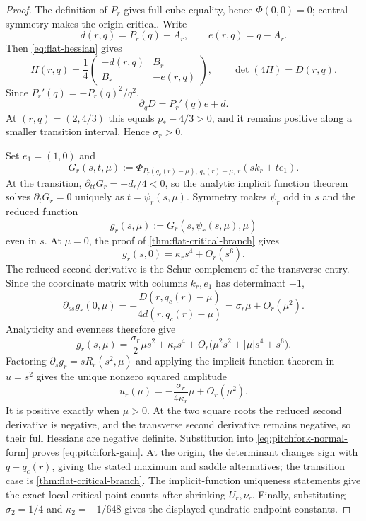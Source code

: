 \documentclass[11pt,reqno]{amsart}
\numberwithin{equation}{section}
\theoremstyle{definition}
\theoremstyle{remark}
\begin{document}
\begin{proof}
The definition of $P_r$ gives full-cube equality, hence $\Phi(0,0)=0$; central
symmetry makes the origin critical.  Write
\[
  d(r,q)=P_r(q)-A_r,\qquad e(r,q)=q-A_r.
\]
Then \eqref{eq:flat-hessian} gives
\[
  H(r,q)=\frac14
  \begin{pmatrix}
    -d(r,q)&B_r\\
    B_r&-e(r,q)
  \end{pmatrix},
  \qquad
  \det(4H)=D(r,q).
\]
Since $P_r'(q)=-P_r(q)^2/q^2$,
\[
  \partial_qD=P_r'(q)e+d.
\]
At $(r,q)=(2,4/3)$ this equals $p_*-4/3>0$, and it remains positive along a
smaller transition interval.  Hence $\sigma_r>0$.

Set $e_1=(1,0)$ and
\[
  G_r(s,t,\mu)
  :=\Phi_{P_r(q_c(r)-\mu),\,q_c(r)-\mu,\,r}(sk_r+te_1).
\]
At the transition, $\partial_{tt}G_r=-d_r/4<0$, so the analytic implicit
function theorem solves $\partial_tG_r=0$ uniquely as
$t=\psi_r(s,\mu)$.  Symmetry makes $\psi_r$ odd in $s$ and the reduced
function
\[
  g_r(s,\mu):=G_r(s,\psi_r(s,\mu),\mu)
\]
even in $s$.  At $\mu=0$, the proof of
\cref{thm:flat-critical-branch} gives
\[
  g_r(s,0)=\kappa_rs^4+O_r(s^6).
\]
The reduced second derivative is the Schur complement of the transverse
entry.  Since the coordinate matrix with columns $k_r,e_1$ has determinant
$-1$,
\[
  \partial_{ss}g_r(0,\mu)
  =-\frac{D(r,q_c(r)-\mu)}
  {4d(r,q_c(r)-\mu)}
  =\sigma_r\mu+O_r(\mu^2).
\]
Analyticity and evenness therefore give
\begin{equation}\label{eq:pitchfork-normal-form}
  g_r(s,\mu)
  =\frac{\sigma_r}{2}\mu s^2+\kappa_rs^4
  +O_r\bigl(\mu^2s^2+|\mu|s^4+s^6\bigr).
\end{equation}
Factoring $\partial_sg_r=sR_r(s^2,\mu)$ and applying the implicit function
theorem in $u=s^2$ gives the unique nonzero squared amplitude
\[
  u_r(\mu)=-\frac{\sigma_r}{4\kappa_r}\mu+O_r(\mu^2).
\]
It is positive exactly when $\mu>0$.  At the two square roots the reduced
second derivative is negative, and the transverse second derivative remains
negative, so their full Hessians are negative definite.  Substitution into
\eqref{eq:pitchfork-normal-form} proves \eqref{eq:pitchfork-gain}.  At the
origin, the determinant changes sign with $q-q_c(r)$, giving the stated
maximum and saddle alternatives; the transition case is
\cref{thm:flat-critical-branch}.  The implicit-function uniqueness statements
give the exact local critical-point counts after shrinking $U_r,\nu_r$.
Finally, substituting $\sigma_2=1/4$ and $\kappa_2=-1/648$ gives the displayed
quadratic endpoint constants.
\end{proof}
\end{document}
